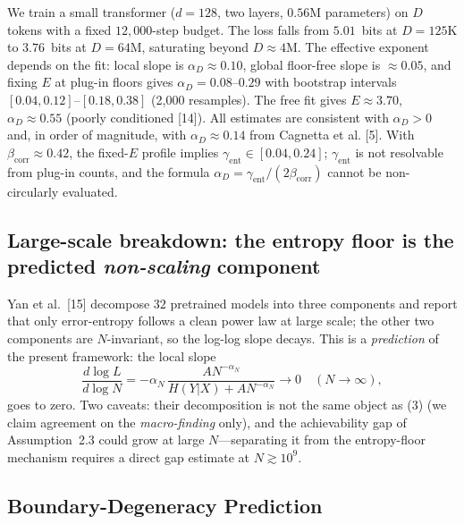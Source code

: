 \documentclass[entropy,article,submit,moreauthors,pdftex]{mdpi}
\begin{document}
We train a small transformer ($d=128$, two layers, $0.56$M parameters) on $D$
tokens with a fixed $12{,}000$-step budget. The loss falls from $5.01$~bits at
$D=125$K to $3.76$~bits at $D=64$M, saturating beyond $D\!\approx\!4$M. The
effective exponent depends on the fit: local slope is
$\alpha_D\!\approx\!0.10$, global floor-free slope is $\approx\!0.05$, and
fixing $E$ at plug-in floors gives $\alpha_D\!=\!0.08$--$0.29$ with bootstrap
intervals $[0.04,0.12]$--$[0.18,0.38]$ (2{,}000 resamples). The free fit gives
$E\!\approx\!3.70$, $\alpha_D\!\approx\!0.55$ (poorly conditioned
[14]). All estimates are consistent with $\alpha_D>0$ and, in
order of magnitude, with $\alpha_D\!\approx\!0.14$ from Cagnetta et al. [5].
With $\beta_{\mathrm{corr}}\!\approx\!0.42$, the fixed-$E$ profile implies
$\gamma_{\mathrm{ent}}\!\in\![0.04,0.24]$; $\gamma_{\mathrm{ent}}$ is not resolvable
from plug-in counts, and the formula $\alpha_D\!=\!\gamma_{\mathrm{ent}}/(2\beta_{\mathrm{corr}})$ cannot be non-circularly evaluated.

\subsection{Large-scale breakdown: the entropy floor is the predicted
\emph{non-scaling} component}
\label{sec:yan}

Yan et al.~[15] decompose $32$ pretrained models into three
components and report that only error-entropy follows a clean power law at
large scale; the other two components are $N$-invariant, so the log-log slope
decays. This is a \emph{prediction} of the present framework: the local slope
\begin{equation}
\frac{d\log L}{d\log N}
  = -\alpha_N\,\frac{A N^{-\alpha_N}}{H(Y|X)+A N^{-\alpha_N}}
  \longrightarrow 0 \quad (N\to\infty),
  \label{eq:slope}
\end{equation}
goes to zero. Two caveats: their decomposition is not the same object as
(3) (we claim agreement on the \emph{macro-finding} only), and
the achievability gap of Assumption~2.3 could grow at large
$N$---separating it from the entropy-floor mechanism requires a direct gap
estimate at $N\gtrsim10^9$.

\subsection{Boundary-Degeneracy Prediction}
\label{sec:prediction}
\end{document}
